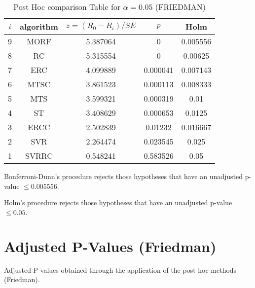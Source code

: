 \documentclass[a4paper,10pt]{article}
\begin{document}
\begin{landscape}
\begin{table}[!htp]
\centering\footnotesize
\begin{tabular}{ccccc}
$i$&algorithm&$z=(R_0 - R_i)/SE$&$p$&Holm \\
\hline9&MORF&5.387064&0&0.005556\\8&RC&5.315554&0&0.00625\\7&ERC&4.099889&0.000041&0.007143\\6&MTSC&3.861523&0.000113&0.008333\\5&MTS&3.599321&0.000319&0.01\\4&ST&3.408629&0.000653&0.0125\\3&ERCC&2.502839&0.01232&0.016667\\2&SVR&2.264474&0.023545&0.025\\1&SVRRC&0.548241&0.583526&0.05\\\hline
\end{tabular}
\caption{Post Hoc comparison Table for $\alpha=0.05$ (FRIEDMAN)}
\end{table}Bonferroni-Dunn's procedure rejects those hypotheses that have an unadjusted p-value $\le0.005556$.

Holm's procedure rejects those hypotheses that have an unadjusted p-value $\le0.05$.


\newpage

\section{Adjusted P-Values (Friedman)}


Adjusted P-values obtained through the application of the post hoc methods (Friedman).


\end{landscape}
\end{document}
